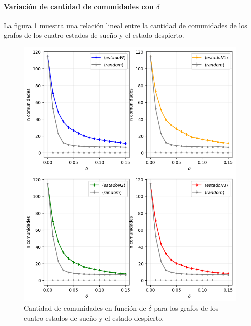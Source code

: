 \documentclass{article}
\begin{document}
\paragraph*{Variación de cantidad de comunidades con $\delta$}

La figura \ref{fg:cantidadComunidades} muestra una relación lineal entre la cantidad de comunidades de los grafos de los cuatro estados de sueño y el estado despierto.

\begin{figure}[ht]
	\centering
	\includegraphics[width= 0.8\linewidth]{cantidadComunidades.png}
	\caption{Cantidad de comunidades en función de $\delta$ para los grafos de los cuatro estados de sueño y el estado despierto.
	}
	\label{fg:cantidadComunidades}
\end{figure}



\printbibliography[title= Referencias, heading=bibintoc]
\end{document}
